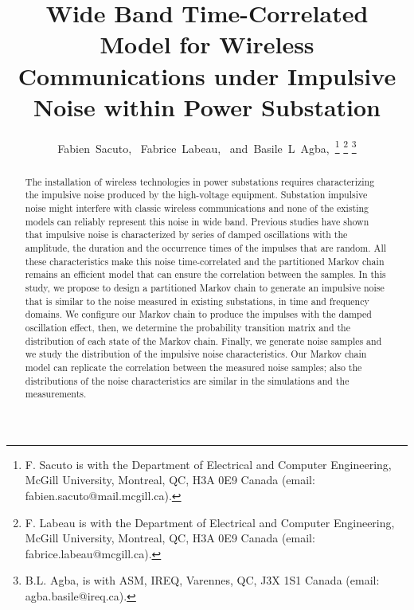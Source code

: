 \documentclass[journal]{IEEEtran}
\begin{document}
\title{Wide Band Time-Correlated Model for Wireless Communications under Impulsive Noise within Power Substation}


\author{Fabien~Sacuto,~
        Fabrice~Labeau,~
        and~Basile~L~Agba,~\thanks{F. Sacuto is with the Department
of Electrical and Computer Engineering, McGill University, Montreal,
QC, H3A 0E9 Canada (email: fabien.sacuto@mail.mcgill.ca).}
\thanks{F. Labeau is with the Department
of Electrical and Computer Engineering, McGill University, Montreal,
QC, H3A 0E9 Canada (email: fabrice.labeau@mcgill.ca).}
\thanks{B.L. Agba, is with ASM, IREQ, Varennes,
QC, J3X 1S1 Canada (email: agba.basile@ireq.ca).}}


\maketitle


\begin{abstract}




The installation of wireless technologies in power substations requires characterizing the impulsive noise produced by the high-voltage equipment. Substation impulsive noise might interfere with classic wireless communications and none of the existing models can reliably represent this noise in wide band. Previous studies have shown that impulsive noise is characterized by series of damped oscillations with the amplitude, the duration and the occurrence times of the impulses that are random. All these characteristics make this noise time-correlated and the partitioned Markov chain remains an efficient model that can ensure the correlation between the samples. In this study, we propose to design a partitioned Markov chain to generate an impulsive noise that is similar to the noise measured in existing substations, in time and frequency domains. We configure our Markov chain to produce the impulses with the damped oscillation effect, then, we determine the probability transition matrix and the distribution of each state of the Markov chain. Finally, we generate noise samples and we study the distribution of the impulsive noise characteristics. Our Markov chain model can replicate the correlation between the measured noise samples; also the distributions of the noise characteristics are similar in the simulations and the measurements.
\end{abstract}
\end{document}

